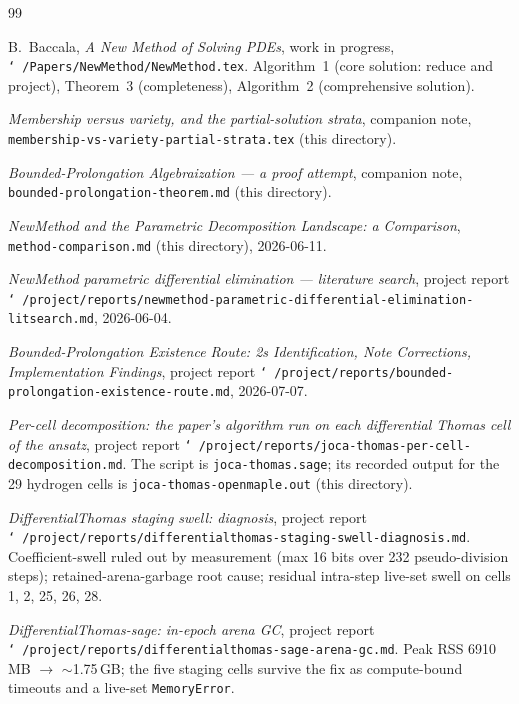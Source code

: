 \documentclass[11pt]{article}
\newcommand{\code}[1]{\texttt{#1}}
\begin{document}
\begin{thebibliography}{99}

 B.~Baccala, \emph{A New Method of Solving PDEs}, work in
progress, \code{\char`~/Papers/NewMethod/NewMethod.tex}. Algorithm~1 (core
solution: reduce and project), Theorem~3 (completeness), Algorithm~2
(comprehensive solution).

 \emph{Membership versus variety, and the
partial-solution strata}, companion note,
\code{membership-vs-variety-partial-strata.tex} (this directory).

 \emph{Bounded-Prolongation
Algebraization --- a proof attempt}, companion note,
\code{bounded-prolongation-theorem.md} (this directory).

 \emph{NewMethod and the Parametric Decomposition
Landscape: a Comparison}, \code{method-comparison.md} (this directory),
2026-06-11.

 \emph{NewMethod parametric differential elimination ---
literature search}, project report
\code{\char`~/project/reports/newmethod-parametric-differential-elimination-litsearch.md},
2026-06-04.

 \emph{Bounded-Prolongation Existence Route:
2s Identification, Note Corrections, Implementation Findings}, project report
\code{\char`~/project/reports/bounded-prolongation-existence-route.md},
2026-07-07.

 \emph{Per-cell decomposition: the paper's
algorithm run on each differential Thomas cell of the ansatz}, project report
\code{\char`~/project/reports/joca-thomas-per-cell-decomposition.md}. The
script is \code{joca-thomas.sage}; its recorded output for the 29 hydrogen
cells is \code{joca-thomas-openmaple.out} (this directory).

 \emph{DifferentialThomas staging swell: diagnosis},
project report
\code{\char`~/project/reports/differentialthomas-staging-swell-diagnosis.md}.
Coefficient-swell ruled out by measurement (max 16 bits over 232
pseudo-division steps); retained-arena-garbage root cause; residual
intra-step live-set swell on cells 1, 2, 25, 26, 28.

 \emph{DifferentialThomas-sage: in-epoch arena GC},
project report
\code{\char`~/project/reports/differentialthomas-sage-arena-gc.md}. Peak RSS
6910\,MB $\to$ $\sim$1.75\,GB; the five staging cells survive the fix as
compute-bound timeouts and a live-set \code{MemoryError}.


\end{thebibliography}
\end{document}
